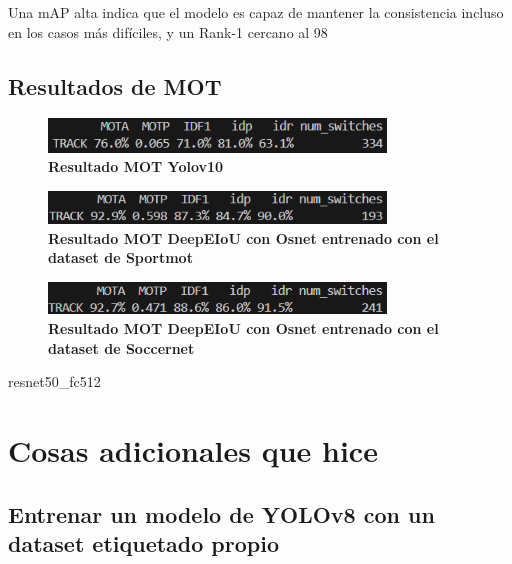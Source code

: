\documentclass[12pt, a4paper, twoside]{article}
\begin{document}
 	Una mAP alta indica que el modelo es capaz de mantener la consistencia incluso en los casos más difíciles, y un Rank-1 cercano al 98%
 	
 	\subsection{Resultados de MOT}
	
	\begin{figure}[H]
		\centering
		\includegraphics[width=0.8\textwidth]{image/metricas_mot_yolo10}
		\caption{\textbf{Resultado MOT Yolov10}}
		\label{fig:Resultado Yolov10 mot}
	\end{figure}
	
	\begin{figure}[H]
		\centering
		\includegraphics[width=0.8\textwidth]{image/metricas_mot_deepEIoU_osnet_sportmot}
		\caption{\textbf{Resultado MOT DeepEIoU con Osnet entrenado con el dataset de Sportmot}}
		\label{fig:Resultado DeepEIoU con Osnet mot sportmot}
	\end{figure}
	
	\begin{figure}[H]
		\centering
		\includegraphics[width=0.8\textwidth]{image/metricas_mot_deepEIoU_osnet_soccernet}
		\caption{\textbf{Resultado MOT DeepEIoU con Osnet entrenado con el dataset de Soccernet}}
		\label{fig:Resultado DeepEIoU con Osnet mot soccernet}
	\end{figure}
	
	resnet50\_fc512
	
	
	\section{Cosas adicionales que hice}
	
	\subsection{Entrenar un modelo de YOLOv8 con un dataset etiquetado propio}
	
\end{document}

